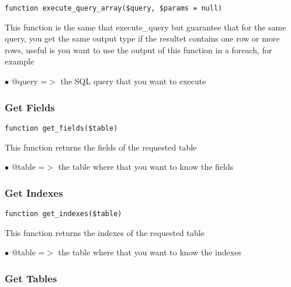 \documentclass[a4paper]{article}
\begin{document}
\begin{lstlisting}
function execute_query_array($query, $params = null)
\end{lstlisting}

This function is the same that execute\_query but guarantee that for the
same query, you get the same output type if the resultet contains one
row or more rows, useful is you want to use the output of this function
in a foreach, for example

\begin{compactitem}
\item[\color{myblue}$\bullet$] @query =$>$ the SQL query that you want to execute
\end{compactitem}

\hypertarget{toc219}{}
\subsubsection{Get Fields}

\begin{lstlisting}
function get_fields($table)
\end{lstlisting}

This function returns the fields of the requested table

\begin{compactitem}
\item[\color{myblue}$\bullet$] @table =$>$ the table where that you want to know the fields
\end{compactitem}

\hypertarget{toc220}{}
\subsubsection{Get Indexes}

\begin{lstlisting}
function get_indexes($table)
\end{lstlisting}

This function returns the indexes of the requested table

\begin{compactitem}
\item[\color{myblue}$\bullet$] @table =$>$ the table where that you want to know the indexes
\end{compactitem}

\hypertarget{toc221}{}
\subsubsection{Get Tables}
\end{document}
